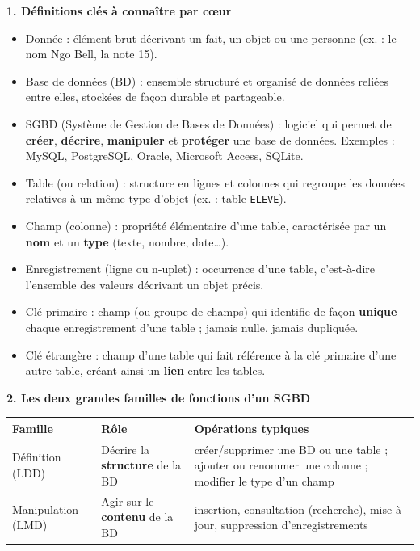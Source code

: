 \documentclass[11pt]{article}
\newcommand{\cle}[1]{{\popxbold\color{popdark}#1}}
\begin{document}
\begin{bilan}
\textbf{1. Définitions clés à connaître par c\oe ur}
\begin{itemize}
  \item \cle{Donnée} : élément brut décrivant un fait, un objet ou une personne (ex. : le nom \og{}Ngo Bell\fg{}, la note 15).
  \item \cle{Base de données (BD)} : ensemble structuré et organisé de données reliées entre elles, stockées de façon durable et partageable.
  \item \cle{SGBD} (Système de Gestion de Bases de Données) : logiciel qui permet de \textbf{créer}, \textbf{décrire}, \textbf{manipuler} et \textbf{protéger} une base de données. Exemples : MySQL, PostgreSQL, Oracle, Microsoft Access, SQLite.
  \item \cle{Table} (ou relation) : structure en lignes et colonnes qui regroupe les données relatives à un même type d'objet (ex. : table \texttt{ELEVE}).
  \item \cle{Champ} (colonne) : propriété élémentaire d'une table, caractérisée par un \textbf{nom} et un \textbf{type} (texte, nombre, date\dots).
  \item \cle{Enregistrement} (ligne ou n-uplet) : occurrence d'une table, c'est-à-dire l'ensemble des valeurs décrivant un objet précis.
  \item \cle{Clé primaire} : champ (ou groupe de champs) qui identifie de façon \textbf{unique} chaque enregistrement d'une table ; jamais nulle, jamais dupliquée.
  \item \cle{Clé étrangère} : champ d'une table qui fait référence à la clé primaire d'une autre table, créant ainsi un \textbf{lien} entre les tables.
\end{itemize}

\textbf{2. Les deux grandes familles de fonctions d'un SGBD}
\begin{center}
\begin{tabularx}{\linewidth}{|l|X|X|}
\hline
\rowcolor{popblueL}
\textbf{Famille} & \textbf{Rôle} & \textbf{Opérations typiques} \\
\hline
Définition (LDD) & Décrire la \textbf{structure} de la BD & créer/supprimer une BD ou une table ; ajouter ou renommer une colonne ; modifier le type d'un champ \\
\hline
Manipulation (LMD) & Agir sur le \textbf{contenu} de la BD & insertion, consultation (recherche), mise à jour, suppression d'enregistrements \\
\hline
\end{tabularx}
\end{center}


\end{bilan}
\end{document}
